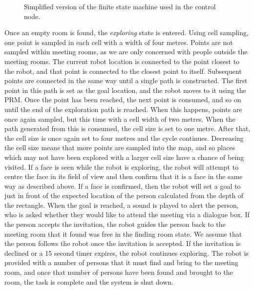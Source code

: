 \documentclass[conference]{IEEEtran}
\begin{document}
\begin{figure}
  \centering
  \caption{Simplified version of the finite state machine used in the control node.}
  \label{fig:fsm}
\end{figure}

Once an empty room is found, the \emph{exploring} state is entered. Using cell sampling, one point is sampled in each cell with a width of four metres. Points are not sampled within meeting rooms, as we are only concerned with people outside the meeting rooms. The current robot location is connected to the point closest to the robot, and that point is connected to the closest point to itself. Subsequent points are connected in the same way until a single path is constructed. The first point in this path is set as the goal location, and the robot moves to it using the PRM. Once the point has been reached, the next point is consumed, and so on until the end of the exploration path is reached. When this happens, points are once again sampled, but this time with a cell width of two metres. When the path generated from this is consumed, the cell size is set to one metre. After that, the cell size is once again set to four metres and the cycle continues. Decreasing the cell size means that more points are sampled into the map, and so places which may not have been explored with a larger cell size have a chance of being visited. If a face is seen while the robot is exploring, the robot will attempt to centre the face in its field of view and then confirm that it is a face in the same way as described above. If a face is confirmed, then the robot will set a goal to just in front of the expected location of the person calculated from the depth of the rectangle. When the goal is reached, a sound is played to alert the person, who is asked whether they would like to attend the meeting via a dialogue box. If the person accepts the invitation, the robot guides the person back to the meeting room that it found was free in the finding room state. We assume that the person follows the robot once the invitation is accepted. If the invitation is declined or a 15 second timer expires, the robot continues exploring. The robot is provided with a number of persons that it must find and bring to the meeting room, and once that number of persons have been found and brought to the room, the task is complete and the system is shut down.
\end{document}
